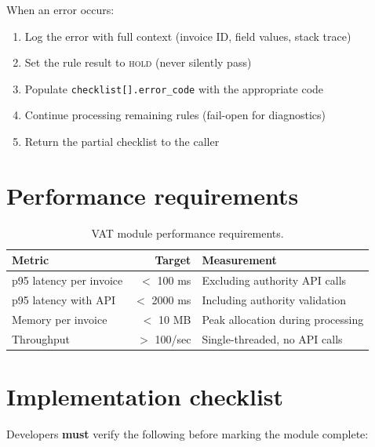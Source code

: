 \documentclass[11pt,a4paper,twoside]{report}
\begin{document}
When an error occurs:

\begin{enumerate}
  \item Log the error with full context (invoice ID, field values, stack trace)
  \item Set the rule result to \textsc{hold} (never silently pass)
  \item Populate \texttt{checklist[].error\_code} with the appropriate code
  \item Continue processing remaining rules (fail-open for diagnostics)
  \item Return the partial checklist to the caller
\end{enumerate}

\section{Performance requirements}

\begin{table}[htbp]
\centering
\caption{VAT module performance requirements.}
\label{tab:vat-perf}
\footnotesize
\begin{tabularx}{\linewidth}{@{}l r X@{}}
\toprule
\textbf{Metric} & \textbf{Target} & \textbf{Measurement} \\ \midrule
p95 latency per invoice & $<$ 100 ms & Excluding authority API calls \\
p95 latency with API    & $<$ 2000 ms & Including authority validation \\
Memory per invoice      & $<$ 10 MB & Peak allocation during processing \\
Throughput              & $>$ 100/sec & Single-threaded, no API calls \\
\bottomrule
\end{tabularx}
\end{table}

\section{Implementation checklist}

Developers \textbf{must} verify the following before marking the module
complete:
\end{document}
